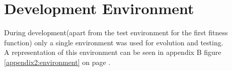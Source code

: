 \section{Development Environment}
During development(apart from the test environment for the first fitness function) only a single environment was used for evolution and testing.\\
A representation of this environment can be seen in appendix B figure \ref{appendix2:environment} on page \pageref{appendix2:environment}. 

